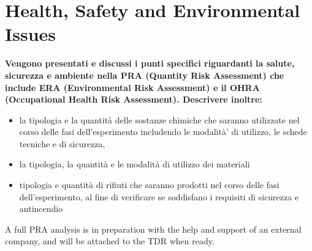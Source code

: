 \section{Health, Safety and Environmental Issues}
\label{sec:HealthSafetyEnvironmentalIssues}

{\bf\color{red}
Vengono presentati e discussi i punti specifici riguardanti la salute, sicurezza e ambiente nella PRA (Quantity Risk Assessment) che include ERA (Environmental Risk Assessment) e il OHRA (Occupational Health Risk Assessment).
Descrivere inoltre:
\begin{itemize}
\item la tipologia e la quantit\`a delle sostanze chimiche che saranno utilizzate nel corso delle fasi dell’esperimento includendo le modalit\`a' di utilizzo, le schede tecniche e di sicurezza,
\item la tipologia, la quantit\`a e le modalit\`a di utilizzo dei materiali
\item tipologia e quantit\`a di rifiuti che saranno prodotti nel corso delle fasi
dell’esperimento, al fine di verificare se soddisfano i requisiti di sicurezza e antincendio
\end{itemize}
}

A full PRA analysis is in preparation with the help and support of an external company, and will be attached to the TDR when ready.
